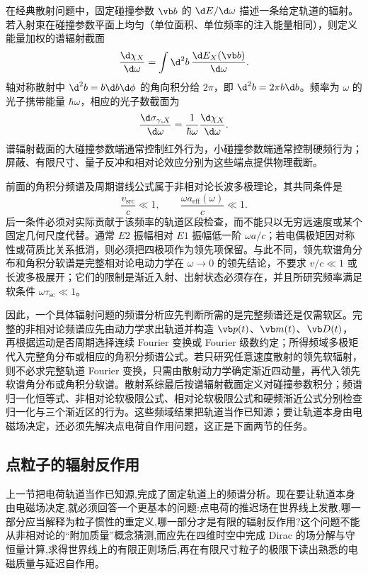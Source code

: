 在经典散射问题中，固定碰撞参数 $\vb b$ 的 $\d E/\d\omega$ 描述一条给定轨道的辐射。若入射束在碰撞参数平面上均匀（单位面积、单位频率的注入能量相同），则定义能量加权的谱辐射截面
\begin{equation*}
	\frac{\d\chi_X}{\d\omega}
	=\int\d^2b\,\frac{\d E_X(\vb b)}{\d\omega}.
\end{equation*}
轴对称散射中 $\d^2b=b\d b\d\phi$ 的角向积分给 $2\pi$，即 $\d^2b=2\pi b\d b$。频率为 $\omega$ 的光子携带能量 $\hbar\omega$，相应的光子数截面为
\begin{equation*}
	\frac{\d\sigma_{\gamma,X}}{\d\omega}
	=\frac{1}{\hbar\omega}\frac{\d\chi_X}{\d\omega}.
\end{equation*}
谱辐射截面的大碰撞参数端通常控制红外行为，小碰撞参数端通常控制硬频行为；屏蔽、有限尺寸、量子反冲和相对论效应分别为这些端点提供物理截断。

前面的角积分频谱及周期谱线公式属于非相对论长波多极理论，其共同条件是
\begin{equation*}
	\frac{v_{\mathrm{src}}}{c}\ll1,
	\qquad
	\frac{\omega a_{\mathrm{eff}}(\omega)}{c}\ll1.
\end{equation*}
后一条件必须对实际贡献于该频率的轨道区段检查，而不能只以无穷远速度或某个固定几何尺度代替。通常 $E2$ 振幅相对 $E1$ 振幅低一阶 $\omega a/c$；若电偶极矩因对称性或荷质比关系抵消，则必须把四极项作为领先项保留。与此不同，领先软谱角分布和角积分软谱是完整相对论电动力学在 $\omega\to0$ 的领先结论，不要求 $v/c\ll1$ 或长波多极展开；它们的限制是渐近入射、出射状态必须存在，并且所研究频率满足软条件 $\omega\tau_{\mathrm{sc}}\ll1$。

因此，一个具体辐射问题的频谱分析应先判断所需的是完整频谱还是仅需软区。完整的非相对论频谱应先由动力学求出轨道并构造 $\vb p(t)$、$\vb m(t)$、$\vb D(t)$，再根据运动是否周期选择连续 Fourier 变换或 Fourier 级数约定；所得频域多极矩代入完整角分布或相应的角积分频谱公式。若只研究任意速度散射的领先软辐射，则不必求完整轨道 Fourier 变换，只需由散射动力学确定渐近四动量，再代入领先软谱角分布或角积分软谱。散射系综最后按谱辐射截面定义对碰撞参数积分；频谱归一化恒等式、非相对论软极限公式、相对论软极限公式和硬频渐近公式分别检查归一化与三个渐近区的行为。这些频域结果把轨道当作已知源；要让轨道本身由电磁场决定，还必须先解决点电荷自作用问题，这正是下面两节的任务。

\subsection{点粒子的辐射反作用}

上一节把电荷轨道当作已知源,完成了固定轨道上的频谱分析。现在要让轨道本身由电磁场决定,就必须回答一个更基本的问题:点电荷的推迟场在世界线上发散,哪一部分应当解释为粒子惯性的重定义,哪一部分才是有限的辐射反作用?这个问题不能从非相对论的“附加质量”概念猜测,而应先在四维时空中完成 Dirac 的场分解与守恒量计算,求得世界线上的有限正则场后,再在有限尺寸粒子的极限下读出熟悉的电磁质量与延迟自作用。

